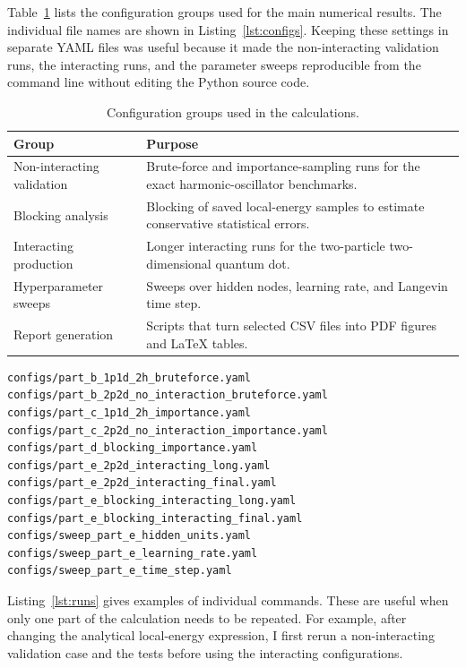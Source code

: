 \documentclass[10pt,a4paper]{article}
\begin{document}
Table~\ref{tab:config-groups} lists the configuration groups used for the main numerical results.  The individual file names are shown in Listing~\ref{lst:configs}.  Keeping these settings in separate YAML files was useful because it made the non-interacting validation runs, the interacting runs, and the parameter sweeps reproducible from the command line without editing the Python source code.

\begin{table}[H]
\centering
\caption{Configuration groups used in the calculations.}
\label{tab:config-groups}
\begin{tabularx}{\columnwidth}{@{}>{\raggedright\arraybackslash}p{}X@{}}
\toprule
Group & Purpose \\
\midrule
Non-interacting validation & Brute-force and importance-sampling runs for the exact harmonic-oscillator benchmarks. \\
Blocking analysis & Blocking of saved local-energy samples to estimate conservative statistical errors. \\
Interacting production & Longer interacting runs for the two-particle two-dimensional quantum dot. \\
Hyperparameter sweeps & Sweeps over hidden nodes, learning rate, and Langevin time step. \\
Report generation & Scripts that turn selected CSV files into PDF figures and \LaTeX{} tables. \\
\bottomrule
\end{tabularx}
\end{table}

\begin{lstlisting}[caption={Selected configuration files.},label={lst:configs},basicstyle=\ttfamily\small]
configs/part_b_1p1d_2h_bruteforce.yaml
configs/part_b_2p2d_no_interaction_bruteforce.yaml
configs/part_c_1p1d_2h_importance.yaml
configs/part_c_2p2d_no_interaction_importance.yaml
configs/part_d_blocking_importance.yaml
configs/part_e_2p2d_interacting_long.yaml
configs/part_e_2p2d_interacting_final.yaml
configs/part_e_blocking_interacting_long.yaml
configs/part_e_blocking_interacting_final.yaml
configs/sweep_part_e_hidden_units.yaml
configs/sweep_part_e_learning_rate.yaml
configs/sweep_part_e_time_step.yaml
\end{lstlisting}

Listing~\ref{lst:runs} gives examples of individual commands.  These are useful when only one part of the calculation needs to be repeated.  For example, after changing the analytical local-energy expression, I first rerun a non-interacting validation case and the tests before using the interacting configurations.
\end{document}
